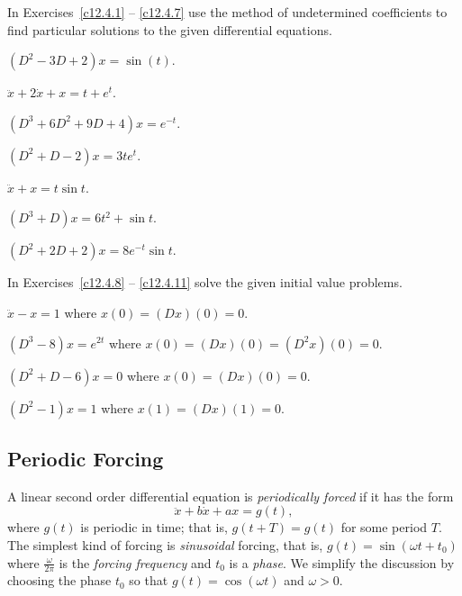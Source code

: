 \noindent In Exercises~\ref{c12.4.1} -- \ref{c12.4.7} use the method of 
undetermined coefficients to find particular solutions to the given 
differential equations.
\begin{exercise}  \label{c12.4.1}
$(D^2-3D+2)x = \sin(t)$.
\end{exercise}
\begin{exercise}  \label{c12.4.2}
$\ddot{x}+2\dot{x}+x = t + e^t$.
\end{exercise}
\begin{exercise}  \label{c12.4.3}
$(D^3+6D^2+9D+4)x = e^{-t}$.
\end{exercise}
\begin{exercise}  \label{c12.4.4}
$(D^2+D-2)x = 3te^t$.
\end{exercise}
\begin{exercise}  \label{c12.4.5}
$\ddot{x}+x = t\sin t$.
\end{exercise}
\begin{exercise}  \label{c12.4.6}
$(D^3+D)x = 6t^2+\sin t$.
\end{exercise}
\begin{exercise}  \label{c12.4.7}
$(D^2+2D+2)x = 8e^{-t}\sin t$.
\end{exercise}

\noindent In Exercises~\ref{c12.4.8}  -- \ref{c12.4.11} solve the given 
initial value problems.
\begin{exercise}  \label{c12.4.8}
$\ddot{x}-x = 1$ where $x(0)=(Dx)(0)=0$.
\end{exercise}
\begin{exercise}  \label{c12.4.9}
$(D^3-8)x = e^{2t}$ where $x(0)=(Dx)(0)=(D^2x)(0)=0$.
\end{exercise}
\begin{exercise}  \label{c12.4.10}
$(D^2+D-6)x = 0$ where $x(0)=(Dx)(0)=0$.
\end{exercise}
\begin{exercise}  \label{c12.4.11}
$(D^2-1)x = 1$ where $x(1)=(Dx)(1)=0$.
\end{exercise}


\label{S:resonance}

\subsection*{Periodic Forcing}

A linear second order differential equation is {\em periodically forced\/} 
 if it has the form
\[
\ddot{x} + b\dot{x} + ax = g(t),
\]
where $g(t)$ is periodic in time; that is, $g(t+T) = g(t)$ for some
period $T$.  The simplest kind of forcing is {\em sinusoidal\/} forcing,
that is, $g(t)=\sin(\omega t+ t_0)$ where $\frac{\omega}{2\pi}$ is the 
{\em forcing frequency\/} and $t_0$ is a 
{\em phase\/}.  We simplify 
the discussion by choosing the phase $t_0$ so that $g(t)=\cos(\omega t)$ 
and $\omega>0$.

